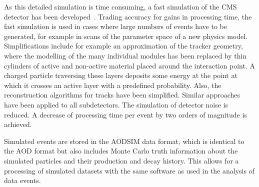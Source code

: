 As this detailed simulation is time consuming, a fast simulation of the CMS detector has been developed~\cite{1742-6596-331-3-032049}. Trading accuracy for gains in processing time, the fast simulation is used in cases where large numbers of events have to be generated, for example in scans of the parameter space of a new physics model. Simplifications include for example an approximation of the tracker geometry, where the modelling of the many individual modules has been replaced by thin cylinders of active and non-active material placed around the interaction point. A charged particle traversing these layers deposits some energy at the point at which it crosses an active layer with a predefined probability. Also, the reconstruction algorithms for tracks have been simplified. Similar approaches have been applied to all subdetectors. The simulation of detector noise is reduced. A decrease of processing time per event by two orders of magnitude is achieved. 

Simulated events are stored in the AODSIM data format, which is identical to the AOD format but also includes Monte Carlo truth information about the simulated particles and their production and decay history. This allows for a processing of simulated datasets with the same software as used in the analysis of data events. 
